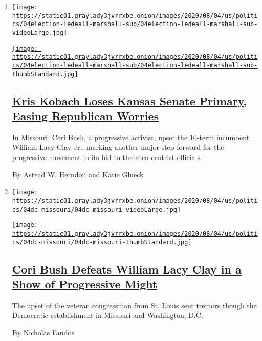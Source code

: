 \begin{enumerate}
\def\labelenumi{\arabic{enumi}.}
\item
  \texttt{[image: https://static01.graylady3jvrrxbe.onion/images/2020/08/04/us/politics/04election-ledeall-marshall-sub/04election-ledeall-marshall-sub-videoLarge.jpg]}

  \href{/2020/08/04/us/politics/kobach-tlaib.html}{\texttt{[image: https://static01.graylady3jvrrxbe.onion/images/2020/08/04/us/politics/04election-ledeall-marshall-sub/04election-ledeall-marshall-sub-thumbStandard.jpg]}}

  \hypertarget{kris-kobach-loses-kansas-senate-primary-easing-republican-worries}{%
  \subsection{\texorpdfstring{\href{/2020/08/04/us/politics/kobach-tlaib.html}{Kris
  Kobach Loses Kansas Senate Primary, Easing Republican
  Worries}}{Kris Kobach Loses Kansas Senate Primary, Easing Republican Worries}}\label{kris-kobach-loses-kansas-senate-primary-easing-republican-worries}}

  In Missouri, Cori Bush, a progressive activist, upset the 10-term
  incumbent William Lacy Clay Jr., marking another major step forward
  for the progressive movement in its bid to threaten centrist
  officials.

  By Astead W. Herndon and Katie Glueck
\item
  \texttt{[image: https://static01.graylady3jvrrxbe.onion/images/2020/08/04/us/politics/04dc-missouri/04dc-missouri-videoLarge.jpg]}

  \href{/2020/08/05/us/politics/cori-bush-missouri-william-lacy-clay.html}{\texttt{[image: https://static01.graylady3jvrrxbe.onion/images/2020/08/04/us/politics/04dc-missouri/04dc-missouri-thumbStandard.jpg]}}

  \hypertarget{cori-bush-defeats-william-lacy-clay-in-a-show-of-progressive-might}{%
  \subsection{\texorpdfstring{\href{/2020/08/05/us/politics/cori-bush-missouri-william-lacy-clay.html}{Cori
  Bush Defeats William Lacy Clay in a Show of Progressive
  Might}}{Cori Bush Defeats William Lacy Clay in a Show of Progressive Might}}\label{cori-bush-defeats-william-lacy-clay-in-a-show-of-progressive-might}}

  The upset of the veteran congressman from St. Louis sent tremors
  though the Democratic establishment in Missouri and Washington, D.C.

  By Nicholas Fandos
\end{enumerate}

